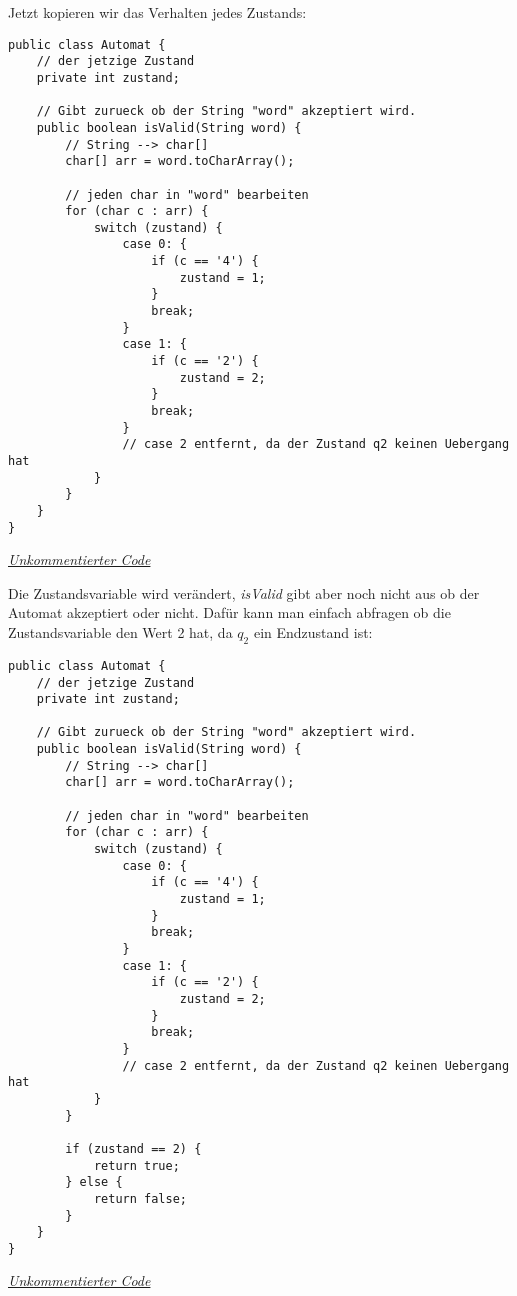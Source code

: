 \begin{flushleft}
Jetzt kopieren wir das Verhalten jedes Zustands:
\end{flushleft}

\begin{center}
\begin{lstlisting}
public class Automat {
    // der jetzige Zustand
    private int zustand;

    // Gibt zurueck ob der String "word" akzeptiert wird.
    public boolean isValid(String word) {
        // String --> char[]
        char[] arr = word.toCharArray();

        // jeden char in "word" bearbeiten
        for (char c : arr) {
            switch (zustand) {
                case 0: {
                    if (c == '4') {
                        zustand = 1;
                    }
                    break;
                }
                case 1: {
                    if (c == '2') {
                        zustand = 2;
                    }
                    break;
                }
                // case 2 entfernt, da der Zustand q2 keinen Uebergang hat
            }
        }
    }
}
\end{lstlisting}
\href{https://raw.githubusercontent.com/tim-tm/articles/refs/heads/main/informatik-notes/code/Automat.java}{\textit{Unkommentierter Code}} \\
\end{center}

\begin{flushleft}
Die Zustandsvariable wird verändert, \textit{isValid}
gibt aber noch nicht aus ob der Automat akzeptiert oder nicht.
Dafür kann man einfach abfragen ob die Zustandsvariable den Wert 2 hat,
da $q_2$ ein Endzustand ist:
\end{flushleft}

\begin{center}
\begin{lstlisting}
public class Automat {
    // der jetzige Zustand
    private int zustand;

    // Gibt zurueck ob der String "word" akzeptiert wird.
    public boolean isValid(String word) {
        // String --> char[]
        char[] arr = word.toCharArray();

        // jeden char in "word" bearbeiten
        for (char c : arr) {
            switch (zustand) {
                case 0: {
                    if (c == '4') {
                        zustand = 1;
                    }
                    break;
                }
                case 1: {
                    if (c == '2') {
                        zustand = 2;
                    }
                    break;
                }
                // case 2 entfernt, da der Zustand q2 keinen Uebergang hat
            }
        }

        if (zustand == 2) {
            return true;
        } else {
            return false;
        }
    }
}
\end{lstlisting}
\href{https://raw.githubusercontent.com/tim-tm/articles/refs/heads/main/informatik-notes/code/Automat.java}{\textit{Unkommentierter Code}} \\
\end{center}

